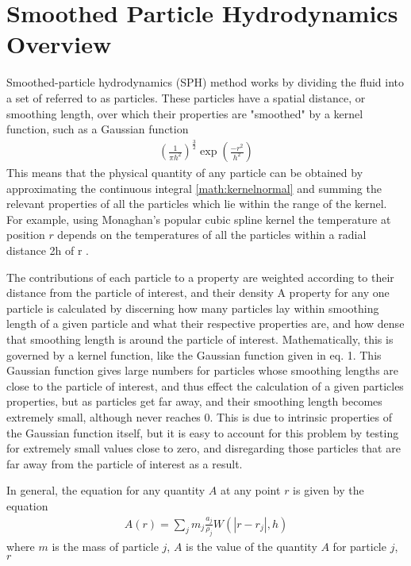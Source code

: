\documentclass{sigchi}
\begin{document}
\section{Smoothed Particle Hydrodynamics Overview}
%
Smoothed-particle hydrodynamics (SPH) method works by dividing the fluid into a set of 
referred to as particles. These particles have a spatial distance, or smoothing length, over which 
their properties are "smoothed" by a kernel function, such as a Gaussian function
\begin{align}
\left( \frac{1}{\pi h^2} \right)^\frac{3}{2}  \exp{\left( \frac{-r^2}{h^2} \right)}
\end{align}
This means that the physical quantity of any particle can be obtained by approximating the continuous integral \ref{math:kernelnormal} and summing the 
relevant properties of all the particles which lie within the range of the kernel. For 
example, using Monaghan's popular cubic spline kernel the temperature at position $r$ 
depends on the temperatures of all the particles within a radial distance 2h of r \cite{wikiarticle}.
\par\medskip
%
The contributions of each particle to a property are weighted according to their distance 
from the particle of interest, and their density
A property for any one particle is calculated by discerning how many particles lay within
smoothing length of a given particle and what their respective properties are, and how 
dense that smoothing length is around the particle of interest. Mathematically, this is 
governed by a kernel function, like the Gaussian function given in eq. 1. This Gaussian
function gives large numbers for particles whose smoothing lengths are close to the 
particle of interest, and thus effect the calculation of a given particles properties, 
but as particles get far away, and their smoothing length becomes extremely small, 
although never reaches 0. This is due to intrinsic properties of the 
Gaussian function itself, but it is easy to account for this problem by testing for 
extremely small values close to zero, and disregarding those particles that are far away 
from the particle of interest as a result.
\par\medskip
%
In general, the equation for any quantity $A$ at any point $r$ is given by the equation
\begin{align}
A(r) = \sum_{j} m_j \frac{a_j}{\rho_j} W (|r - r_j|,h)
\end{align}
where $m$ is the mass of particle $j$, $A$ is the value of the quantity $A$ for particle $j$, $r$ 
\end{document}
